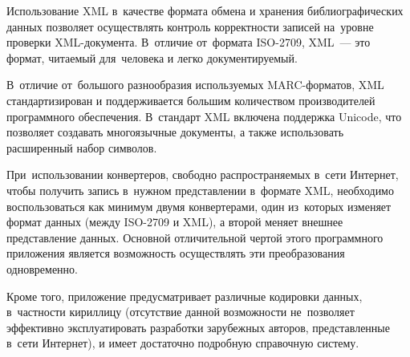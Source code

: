 \documentclass[12pt]{article}
\theoremstyle{definition}
\theoremstyle{remark}
\numberwithin{equation}{section}
\begin{document}
Использование XML в~качестве формата обмена и хранения библиографических
данных позволяет осуществлять контроль корректности записей
на~уровне проверки XML-документа. В~отличие от~формата ISO-2709,
XML~--- это формат, читаемый для~человека и легко документируемый.

В~отличие от~большого разнообразия используемых MARC-форматов, XML
стандартизирован и поддерживается большим количеством производителей
программного обеспечения. В~стандарт XML включена поддержка Unicode,
что позволяет создавать многоязычные документы, а также использовать
расширенный набор символов.

При~использовании конвертеров, свободно распространяемых в~сети
Интернет, чтобы получить запись в~нужном представлении в~формате XML,
необходимо воспользоваться как минимум двумя конвертерами, один из~которых
изменяет формат данных (между ISO-2709 и XML), а второй меняет внешнее
представление данных. Основной отличительной чертой этого программного
приложения является возможность осуществлять эти преобразования одновременно.

Кроме того, приложение предусматривает различные кодировки данных,
в~частности кириллицу (отсутствие данной возможности не~позволяет
эффективно эксплуатировать разработки зарубежных авторов, представленные
в~сети Интернет), и имеет достаточно подробную справочную систему.
\end{document}
